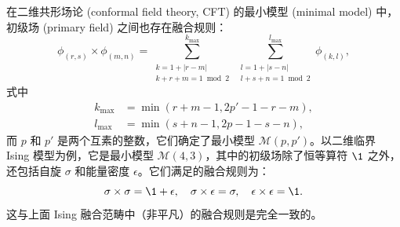 在二维共形场论 (conformal field theory, CFT) 的最小模型 (minimal model) 中，初级场 (primary field) 之间也存在融合规则\cite{ginsparg1988applied,francesco2012conformal}：
\begin{equation}
  \phi_{(r,s)} \times \phi_{(m,n)}
  = \sum_{\substack{k=1+|r-m| \\ k+r+m=1 \bmod 2}}^{k_{\max}} \,
    \sum_{\substack{l=1+|s-n| \\ l+s+n=1 \bmod 2}}^{l_{\max}} \phi_{(k,l)},
\end{equation}
式中
\begin{equation}
  \begin{aligned}
    k_{\max} &= \min(r+m-1, 2p'-1-r-m), \\
    l_{\max} &= \min(s+n-1, 2p-1-s-n),
  \end{aligned}
\end{equation}
而 $p$ 和 $p'$ 是两个互素的整数，它们确定了最小模型 $\mathcal{M}(p,p')$。以二维临界 Ising 模型为例，它是最小模型 $\mathcal{M}(4,3)$，其中的初级场除了恒等算符 $\1$ 之外，还包括自旋 $\sigma$ 和能量密度 $\epsilon$。它们满足的融合规则为：
\begin{equation}
  \sigma\times\sigma = \1+\epsilon, \quad
  \sigma\times\epsilon = \sigma, \quad
  \epsilon\times\epsilon = \1.
\end{equation}
这与上面 Ising 融合范畴中（非平凡）的融合规则是完全一致的。

